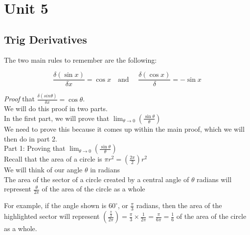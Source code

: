 \documentclass{article}
\begin{document}
\newpage
\section{Unit 5}
\subsection{Trig Derivatives }
The two main rules to remember are the following:
\begin{tcolorbox}[sharp corners=uphill,
    colback=purple!50!white,colframe=blue!25!black,coltext=yellow,
    fontupper=\Large\bfseries,arc=6mm,boxrule=2mm,boxsep=5mm]
$$\frac{\delta (\sin x)}{\delta x}=\cos x \quad \text{and } \quad \frac{\delta(\cos x)}{\delta}=-\sin x$$
\end{tcolorbox}
\textit{Proof} that $\frac{\delta (sin \theta)}{\delta x}=\cos \theta$.\\
We will do this proof in two parts. \\

In the first part, we will prove that  $\lim_{\theta \to 0}\left( \frac{\sin \theta }{\theta}\right)$\\

We need to prove this because it comes up within the main proof, which we will then do in part 2.\\

Part 1: Proving that $\lim_{\theta \to 0}\left( \frac{\sin \theta }{\theta}\right)$\\

Recall that the area of a circle is $\pi r^2=(\frac{2 \pi}{2})r^2$ \\
We will think of our angle $\theta$ in radians \\
The area of the sector of a circle created by a central angle of $\theta$ radians will represent $\frac{\theta}{2\pi}$ of the area of the circle as a whole \\

\begin{minipage}{0.5\textwidth}
For example, if the angle shown is $60^{\circ}$, or $\frac{\pi}{3}$ radians, then the area of the highlighted sector will represent $\left(\frac{\frac{\pi}{3}}{2\pi}\right)=\frac{\pi}{3}\times \frac{1}{2\pi}=\frac{\pi}{6\pi}=\frac{1}{6}$ of the area of the circle as a whole.
\end{minipage}
\hspace{1em}
\begin{minipage}{0.5\textwidth}
\end{minipage}
\end{document}
